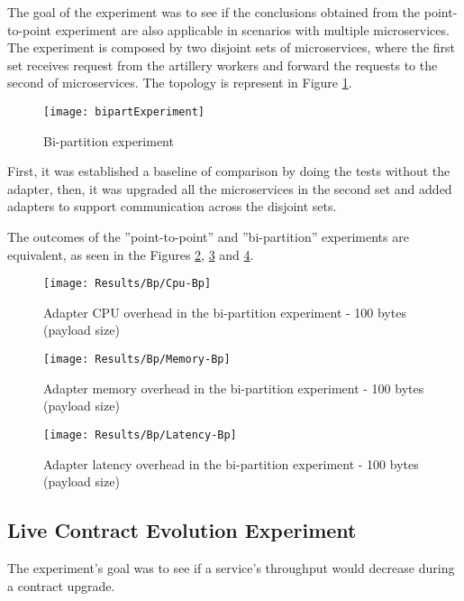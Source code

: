 The goal of the experiment was to see if the conclusions obtained from the point-to-point experiment are also applicable in scenarios with multiple microservices.
The experiment is composed by two disjoint sets of microservices, where the first set receives request from the artillery workers and forward the requests to the second of microservices.
The topology is represent in Figure \ref{fig:biPart}.

\begin{figure}[htbp]
    \centering
    \centerline{\texttt{[image: bipartExperiment]}}
    \caption{Bi-partition experiment}
    \label{fig:biPart}
\end{figure}

First, it was established a baseline of comparison by doing the tests without the adapter,
then, it was upgraded all the microservices in the second set and added adapters to support communication across the disjoint sets.

The outcomes of the ''point-to-point'' and ''bi-partition'' experiments are equivalent, as seen in the Figures \ref{fig:biPartCPU}, \ref{fig:biPartMem} and \ref{fig:biPartLatency}.

\begin{figure}[htbp]
    \centering
    \centerline{\texttt{[image: Results/Bp/Cpu-Bp]}}
    \caption{Adapter CPU overhead in the bi-partition experiment - 100 bytes (payload size)}
    \label{fig:biPartCPU}
\end{figure}

\begin{figure}[htbp]
    \centering
    \centerline{\texttt{[image: Results/Bp/Memory-Bp]}}
    \caption{Adapter memory overhead in the bi-partition experiment - 100 bytes (payload size)}
    \label{fig:biPartMem}
\end{figure}

\begin{figure}[htbp]
    \centering
    \centerline{\texttt{[image: Results/Bp/Latency-Bp]}}
    \caption{Adapter latency overhead in the bi-partition experiment - 100 bytes (payload size)}
    \label{fig:biPartLatency}
\end{figure}

\subsection{Live Contract Evolution Experiment}

The experiment's goal was to see if a service's throughput would decrease during a contract upgrade.

